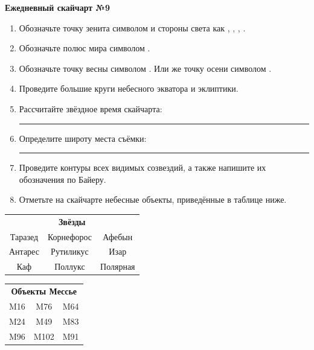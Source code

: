 \documentclass{./SAS-class-skygen}
\begin{document}
    
    
    
	\begin{center}
		\large\textbf{Ежедневный скайчарт №9}
	\end{center}

	\begin{enumerate}
		\item Обозначьте точку зенита символом  и стороны света как , , , .
		\item Обозначьте полюс мира символом .
		\item Обозначьте точку весны символом \Aries. Или же точку осени символом \Libra.
		\item Проведите большие круги небесного экватора и эклиптики.
		\item Рассчитайте звёздное время скайчарта: \rule{2cm}{0.4pt}
		\item Определите широту места съёмки: \rule{2cm}{0.4pt}
		\item Проведите контуры всех видимых созвездий, а также напишите их обозначения по Байеру.
		\item Отметьте на скайчарте небесные объекты, приведённые в таблице ниже.
	\end{enumerate}
	
    \vspace{0.5cm}

    \begin{table}[h!]
    \centering
    \begin{tabular}{ccc}
    \multicolumn{3}{c}{\textbf{Звёзды}} \\ Таразед & Корнефорос & Афебын \\
Антарес & Рутиликус & Изар \\
Каф & Поллукс & Полярная \\

\end{tabular}
    \hfill
    \begin{tabular}{ccc}
    \multicolumn{3}{c}{\textbf{Объекты Мессье}} \\ M16 & M76 & M64 \\
M24 & M49 & M83 \\
M96 & M102 & M91 \\

\end{tabular}
    \end{table}
	
\end{document}
